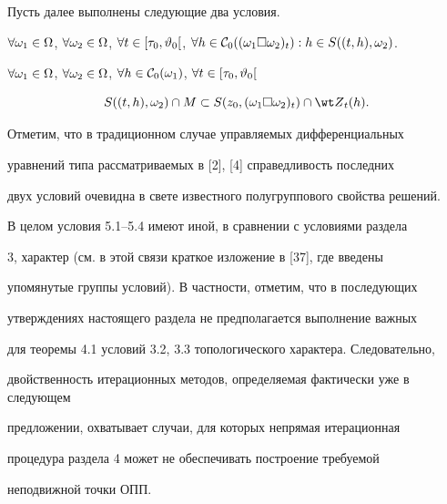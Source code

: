 Пусть далее выполнены следующие два условия.





\begin{conds}


$\fo{{\omega}_1} \in \Om$, $\fo{{\omega}_2} \in \Om$, $\fo{t} \in


[{{\tau}_0},{{\vt}_0}[$, $\fo{h} \in


{{\cal C}_0}({({{\omega}_1}\Box{{\omega}_2})_t}):h \in


S((t,h),{{\omega}_2})$.


\end{conds}





\begin{conds}


$\fo{{\omega}_1} \in \Om$, $\fo{{\omega}_2} \in \Om$, $\fo{h} \in


{{\cal C}_0}({\omega}_1)$, $\fo{t} \in [{{\tau}_0},{{\vt}_0}[$


$$


S((t,h),{{\omega}_2}) \cap M \subset


S({z_0},{({{\omega}_1}\Box{{\omega}_2})_t}) \cap {{\wt Z}_t}(h).


$$


\end{conds}





\begin{notes}


Отметим, что в традиционном случае управляемых дифференциальных


уравнений типа рассматриваемых в [2], [4] справедливость последних


двух условий очевидна в свете известного полугруппового свойства решений.


В целом условия 5.1--5.4 имеют иной, в сравнении с условиями раздела


3, характер (см. в этой связи краткое изложение в [37], где введены


упомянутые группы условий). В частности, отметим, что в последующих


утверждениях настоящего раздела не предполагается выполнение важных


для теоремы 4.1 условий 3.2, 3.3 топологического характера. Следовательно,


двойственность итерационных методов, определяемая фактически уже в следующем


предложении, охватывает случаи, для которых непрямая итерационная


процедура раздела 4 может не обеспечивать построение требуемой


неподвижной точки ОПП.


\end{notes}





